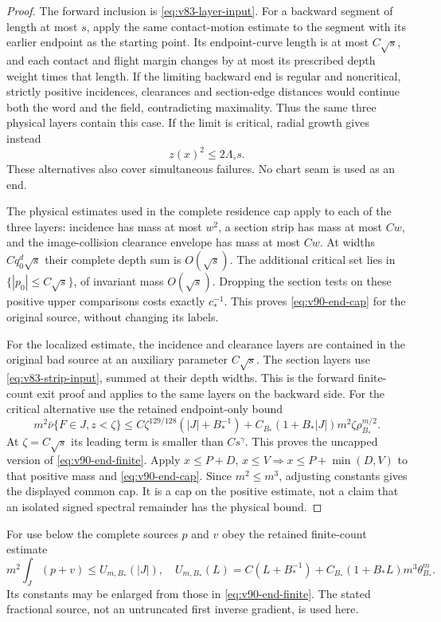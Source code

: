 \begin{proof}
The forward inclusion is \eqref{eq:v83-layer-input}. For a backward
segment of length at most $s$, apply the same contact-motion estimate
to the segment with its earlier endpoint as the starting point. Its
endpoint-curve length is at most $C\sqrt s$, and each contact and
flight margin changes by at most its prescribed depth weight times
that length. If the limiting backward end is regular and noncritical,
strictly positive incidences, clearances and section-edge distances
would continue both the word and the field, contradicting maximality.
Thus the same three physical layers contain this case. If the limit
is critical, radial growth gives instead
\[
                     z(x)^2\le2\Lambda_\circ s.
\]
These alternatives also cover simultaneous failures. No chart seam
is used as an end.

The physical estimates used in the complete residence cap apply to
each of the three layers: incidence has mass at most $w^2$, a section
strip has mass at most $Cw$, and the image-collision clearance envelope
has mass at most $Cw$. At widths $Cq_0^d\sqrt s$ their complete depth
sum is $O(\sqrt s)$. The additional critical set lies in
$\{|p_0|\le C\sqrt s\}$, of invariant mass $O(\sqrt s)$. Dropping
the section tests on these positive upper comparisons costs exactly
$c_*^{-1}$. This proves \eqref{eq:v90-end-cap} for the original
source, without changing its labels.

For the localized estimate, the incidence and clearance layers are
contained in the original bad source at an auxiliary parameter
$C\sqrt s$. The section layers use \eqref{eq:v83-strip-input},
summed at their depth widths. This is the forward finite-count exit
proof and applies to the same layers on the backward side. For the
critical alternative use the retained endpoint-only bound
\[
 m^2\bar\nu\{F\in J,z<\zeta\}
 \le C\zeta^{129/128}(|J|+B_*^{-1})
       +C_{B_*}(1+B_*|J|)m^2\zeta\rho_{B_*}^{m/2}.
\]
At $\zeta=C\sqrt s$ its leading term is smaller than $Cs^\gamma$.
This proves the uncapped version of \eqref{eq:v90-end-finite}.
Apply $x\le P+D$, $x\le V\Rightarrow x\le P+\min(D,V)$ to
that positive mass and \eqref{eq:v90-end-cap}. Since $m^2\le m^3$,
adjusting constants gives the displayed common cap. It is a cap on
the positive estimate, not a claim that an isolated signed spectral
remainder has the physical bound.
\end{proof}

For use below the complete sources $p$ and $v$ obey the retained
finite-count estimate
\begin{equation}\label{eq:v90-volume-finite}
 m^2\int_J(p+v)\le U_{m,B_*}(|J|),\quad
 U_{m,B_*}(L)=C(L+B_*^{-1})
                   +C_{B_*}(1+B_*L)m^3\theta_{B_*}^{m}.
\end{equation}
Its constants may be enlarged from those in
\eqref{eq:v90-end-finite}. The stated fractional source, not an
untruncated first inverse gradient, is used here.

